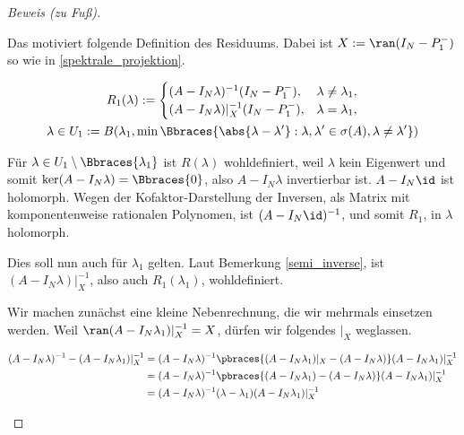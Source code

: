 \begin{proof}[Beweis (zu Fuß)]
\begin{enumerate}[label = (\roman*)]
        Das motiviert folgende Definition des Residuums.
        Dabei ist $X := \ran (I_N - P_1^-)$ so wie in \ref{spektrale_projektion}.

        \begin{multline*}
            R_1(\lambda)
            :=
            \begin{cases}
                (A - I_N \lambda)    ^{-1} (I_N - P_1^-), & \lambda \neq \lambda_1, \\
                (A - I_N \lambda) |_X^{-1} (I_N - P_1^-), & \lambda =    \lambda_1, \\
            \end{cases} \\
            \lambda
            \in
            U_1
            :=
            B
            (
                \lambda_1,
                \min
                \Bbraces
                {
                    \abs{\lambda - \lambda^\prime}:
                    \lambda, \lambda^\prime \in \sigma(A),
                    \lambda \neq \lambda^\prime
                }
            )
        \end{multline*}

        Für $\lambda \in U_1 \setminus \Bbraces{\lambda_1}$ ist $R(\lambda)$ wohldefiniert, weil $\lambda$ kein Eigenwert und somit $\ker (A - I_N \lambda) = \Bbraces{0}$, also $A - I_N \lambda$ invertierbar ist.
        $A - I_N \id$ ist holomorph.
        Wegen der Kofaktor-Darstellung der Inversen, als Matrix mit komponentenweise rationalen Polynomen, ist $(A - I_N \id)^{-1}$, und somit $R_1$, in $\lambda$ holomorph.

        Dies soll nun auch für $\lambda_1$ gelten.
        Laut Bemerkung \ref{semi_inverse}, ist $(A - I_N \lambda) |_X^{-1}$, also auch $R_1(\lambda_1)$, wohldefiniert.

        Wir machen zunächst eine kleine Nebenrechnung, die wir mehrmals einsetzen werden.
        Weil $\ran (A - I_N \lambda_1) |_X^{-1} = X$, dürfen wir folgendes $|_X$ weglassen.

        \begin{align*}
            (A - I_N \lambda)^{-1}
            -
            (A - I_N \lambda_1) |_X^{-1}
            & =
            (A - I_N \lambda)^{-1}
            \pbraces
            {
                (A - I_N \lambda_1) |_X
                -
                (A - I_N \lambda)
            }
            (A - I_N \lambda_1) |_X^{-1} \\
            & =
            (A - I_N \lambda)^{-1}
            \pbraces
            {
                (A - I_N \lambda_1)
                -
                (A - I_N \lambda)
            }
            (A - I_N \lambda_1) |_X^{-1} \\
            & =
            (A - I_N \lambda)^{-1}
            (\lambda - \lambda_1)
            (A - I_N \lambda_1) |_X^{-1}
        \end{align*}


\end{enumerate}
\end{proof}
